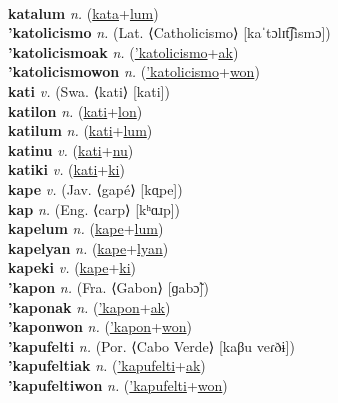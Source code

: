  \label{katales} \\
\textbf{katalum} \textit{n.} (\hyperref[kata]{kata}+\hyperref[lum]{lum})
 \label{katalum} \\
\textbf{'katolicismo} \textit{n.} (Lat. ⟨Catholicismo⟩ [kaˈtɔlɪt͡ʃismɔ])
 \label{'katolicismo} \\
\textbf{'katolicismoak} \textit{n.} (\hyperref['katolicismo]{'katolicismo}+\hyperref[ak]{ak})
 \label{'katolicismoak} \\
\textbf{'katolicismowon} \textit{n.} (\hyperref['katolicismo]{'katolicismo}+\hyperref[won]{won})
 \label{'katolicismowon} \\
\textbf{kati} \textit{v.} (Swa. ⟨kati⟩ [kati])
 \label{kati} \\
\textbf{katilon} \textit{n.} (\hyperref[kati]{kati}+\hyperref[lon]{lon})
 \label{katilon} \\
\textbf{katilum} \textit{n.} (\hyperref[kati]{kati}+\hyperref[lum]{lum})
 \label{katilum} \\
\textbf{katinu} \textit{v.} (\hyperref[kati]{kati}+\hyperref[nu]{nu})
 \label{katinu} \\
\textbf{katiki} \textit{v.} (\hyperref[kati]{kati}+\hyperref[ki]{ki})
 \label{katiki} \\
\textbf{kape} \textit{v.} (Jav. ⟨gapé⟩ [kɑ̤pe])
 \label{kape} \\
\textbf{kap} \textit{n.} (Eng. ⟨carp⟩ [kʰɑɹp])
 \label{kap} \\
\textbf{kapelum} \textit{n.} (\hyperref[kape]{kape}+\hyperref[lum]{lum})
 \label{kapelum} \\
\textbf{kapelyan} \textit{n.} (\hyperref[kape]{kape}+\hyperref[lyan]{lyan})
 \label{kapelyan} \\
\textbf{kapeki} \textit{v.} (\hyperref[kape]{kape}+\hyperref[ki]{ki})
 \label{kapeki} \\
\textbf{'kapon} \textit{n.} (Fra. ⟨Gabon⟩ [ɡabɔ̃])
 \label{'kapon} \\
\textbf{'kaponak} \textit{n.} (\hyperref['kapon]{'kapon}+\hyperref[ak]{ak})
 \label{'kaponak} \\
\textbf{'kaponwon} \textit{n.} (\hyperref['kapon]{'kapon}+\hyperref[won]{won})
 \label{'kaponwon} \\
\textbf{'kapufelti} \textit{n.} (Por. ⟨Cabo Verde⟩ [kaβu veɾðɨ])
 \label{'kapufelti} \\
\textbf{'kapufeltiak} \textit{n.} (\hyperref['kapufelti]{'kapufelti}+\hyperref[ak]{ak})
 \label{'kapufeltiak} \\
\textbf{'kapufeltiwon} \textit{n.} (\hyperref['kapufelti]{'kapufelti}+\hyperref[won]{won})
